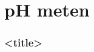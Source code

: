 \section{pH meten}
    \begin{frame}
        \frametitle{<title>}
    
        
    
    \end{frame}